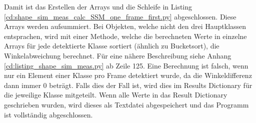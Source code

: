 {	Damit ist das Erstellen der Arrays und die Schleife in Listing \ref{cd:shape_sim_meas_calc_SSM_one_frame_first.py} abgeschlossen. Diese Arrays werden aufsummiert. Bei Objekten, welche nicht den drei Hauptklassen entsprachen, wird mit einer Methode, welche die berechneten Werte in einzelne Arrays für jede detektierte Klasse sortiert (ähnlich zu Bucketsort), die Winkelabweichung berechnet. Für eine nähere Beschreibung siehe Anhang \ref{cd:listing_shape_sim_meas.py} ab Zeile 125.  Eine Berechnung ist falsch, wenn nur ein Element einer Klasse pro Frame detektiert wurde, da die Winkeldifferenz dann immer 0 beträgt. Falls dies der Fall ist, wird dies im Results Dictionary für die jeweilige Klasse mitgeteilt.
	Wenn alle Werte in das Result Dictionary geschrieben wurden, wird dieses als Textdatei abgespeichert und das Programm ist vollständig abgeschlossen.

}







